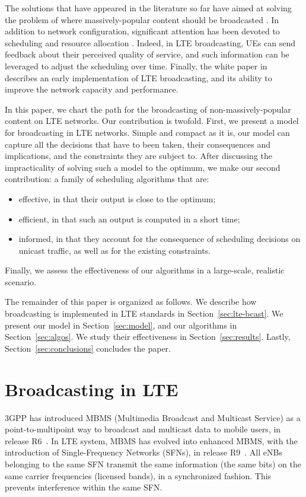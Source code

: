 \documentclass[10pt, conference, compsocconf]{IEEEtran}
\numberwithin{equation}{section}
\begin{document}
The solutions that have appeared in the literature so far have aimed
at solving the problem of where massively-popular content should be
broadcasted 
\cite{Rong,Alexiou}. 
In addition to network configuration, significant attention has been devoted to
scheduling and resource allocation \cite{SVC}. Indeed, in LTE broadcasting, UEs can send
feedback about their perceived quality of service, and such information can be
leveraged to adjust the scheduling over time. 
Finally, the white paper in~\cite{EricssonWP} describes an early implementation of LTE broadcasting,
and its ability to improve the network capacity and performance.

In this paper, we chart the path for the broadcasting of non-massively-popular content on LTE networks. 
Our contribution is twofold.
First, we present a model for broadcasting in LTE networks. Simple and compact as it is, our model can
capture all the decisions that have to been taken, their consequences and implications, and the constraints
they are subject to. After discussing the impracticality of solving such a model to the optimum, we
make our second contribution: a family of scheduling algorithms that are:
\begin{itemize}
\item effective, in that their output is close to the optimum;
\item efficient, in that such an output is computed in a short time;
\item informed, in that  they account for the consequence of scheduling decisions on unicast traffic, as well as for the existing constraints.
\end{itemize}
Finally, we assess the effectiveness of our algorithms in a large-scale, realistic scenario.

The remainder of this paper is organized as follows. 
We describe how broadcasting is implemented in LTE standards in 
Section~\ref{sec:lte-bcast}. We present
our model in Section~\ref{sec:model}, and our algorithms in
Section~\ref{sec:algos}. We study their effectiveness in
Section~\ref{sec:results}. Lastly, Section~\ref{sec:conclusions}
concludes the paper.



\section{Broadcasting in LTE
\label{sec:lte-bcast}
}

3GPP has introduced
MBMS (Multimedia Broadcast and Multicast Service)
as a point-to-multipoint way to broadcast and multicast data to mobile
users, in release R6~\cite{MBMS-R6}. In LTE system, MBMS has evolved into enhanced MBMS, 
with the introduction of Single-Frequency Networks (SFNs),
in release R9~\cite{36.300V9}.
All eNBs belonging to the same SFN
transmit the same information (the same bits) on the same carrier
frequencies (licensed bands), in a
synchronized fashion. This prevents interference  within the same SFN.
\end{document}

